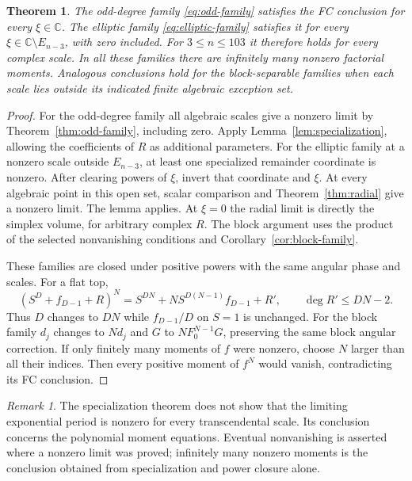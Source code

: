 \documentclass[11pt]{article}
\numberwithin{equation}{section}
\newtheorem{theorem}{Theorem}[section]
\theoremstyle{definition}
\theoremstyle{remark}
\newtheorem{remark}[remark]{Remark}
\newcommand{\C}{\mathbb C}
\begin{document}
\begin{theorem}\label{thm:complex}
The odd-degree family \eqref{eq:odd-family} satisfies the FC conclusion for
every $\xi\in\C$. The elliptic family \eqref{eq:elliptic-family} satisfies it
for every $\xi\in\C\setminus E_{n-3}$, with zero included. For
$3\le n\le103$ it therefore holds for every complex scale. In all these
families there are infinitely many nonzero factorial moments.
Analogous conclusions hold for the block-separable families when each scale
lies outside its indicated finite algebraic exception set.
\end{theorem}
\begin{proof}
For the odd-degree family all algebraic scales give a nonzero limit by
Theorem~\ref{thm:odd-family}, including zero. Apply
Lemma~\ref{lem:specialization}, allowing the coefficients of $R$ as additional
parameters. For the elliptic family at a nonzero scale outside $E_{n-3}$,
at least one specialized remainder coordinate is nonzero. After clearing
powers of $\xi$, invert that coordinate and $\xi$. At every algebraic point
in this open set, scalar comparison and Theorem~\ref{thm:radial} give a
nonzero limit. The lemma applies. At $\xi=0$ the radial limit is directly
the simplex volume, for arbitrary complex $R$. The block argument uses the
product of the selected nonvanishing conditions and Corollary~\ref{cor:block-family}.

These families are closed under positive powers with the same angular phase
and scales. For a flat top,
\[
 (S^D+f_{D-1}+R)^N
 =S^{DN}+N S^{D(N-1)}f_{D-1}+R',\qquad \deg R'\le DN-2.
\]
Thus $D$ changes to $DN$ while $f_{D-1}/D$ on $S=1$ is unchanged.
For the block family $d_j$ changes to $Nd_j$ and $G$ to
$NF_0^{N-1}G$, preserving the same block angular correction.
If only finitely many moments of $f$ were nonzero, choose $N$ larger than
all their indices. Then every positive moment of $f^N$ would vanish,
contradicting its FC conclusion.
\end{proof}

\begin{remark}
The specialization theorem does not show that the limiting exponential
period is nonzero for every transcendental scale. Its conclusion concerns
the polynomial moment equations. Eventual nonvanishing is asserted where a
nonzero limit was proved; infinitely many nonzero moments is the conclusion
obtained from specialization and power closure alone.
\end{remark}
\end{document}
